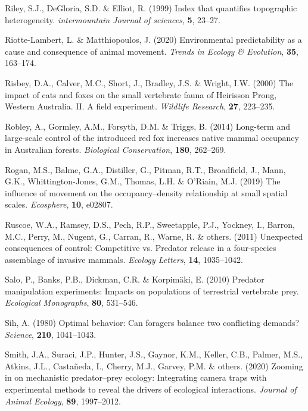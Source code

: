 \documentclass[]{elsarticle} %
\begin{document}
\leavevmode\hypertarget{ref-riley1999index}{}%
Riley, S.J., DeGloria, S.D. \& Elliot, R. (1999) Index that quantifies topographic heterogeneity. \emph{intermountain Journal of sciences}, \textbf{5}, 23--27.

\leavevmode\hypertarget{ref-riotte-lambert2020environmental}{}%
Riotte-Lambert, L. \& Matthiopoulos, J. (2020) Environmental predictability as a cause and consequence of animal movement. \emph{Trends in Ecology \& Evolution}, \textbf{35}, 163--174.

\leavevmode\hypertarget{ref-risbey2000impacts}{}%
Risbey, D.A., Calver, M.C., Short, J., Bradley, J.S. \& Wright, I.W. (2000) The impact of cats and foxes on the small vertebrate fauna of Heirisson Prong, Western Australia. II. A field experiment. \emph{Wildlife Research}, \textbf{27}, 223--235.

\leavevmode\hypertarget{ref-robley2014long}{}%
Robley, A., Gormley, A.M., Forsyth, D.M. \& Triggs, B. (2014) Long-term and large-scale control of the introduced red fox increases native mammal occupancy in Australian forests. \emph{Biological Conservation}, \textbf{180}, 262--269.

\leavevmode\hypertarget{ref-rogan2019influence}{}%
Rogan, M.S., Balme, G.A., Distiller, G., Pitman, R.T., Broadfield, J., Mann, G.K., Whittington-Jones, G.M., Thomas, L.H. \& O'Riain, M.J. (2019) The influence of movement on the occupancy--density relationship at small spatial scales. \emph{Ecosphere}, \textbf{10}, e02807.

\leavevmode\hypertarget{ref-ruscoe2011unexpected}{}%
Ruscoe, W.A., Ramsey, D.S., Pech, R.P., Sweetapple, P.J., Yockney, I., Barron, M.C., Perry, M., Nugent, G., Carran, R., Warne, R. \& others. (2011) Unexpected consequences of control: Competitive vs. Predator release in a four-species assemblage of invasive mammals. \emph{Ecology Letters}, \textbf{14}, 1035--1042.

\leavevmode\hypertarget{ref-salo2010predator}{}%
Salo, P., Banks, P.B., Dickman, C.R. \& Korpimäki, E. (2010) Predator manipulation experiments: Impacts on populations of terrestrial vertebrate prey. \emph{Ecological Monographs}, \textbf{80}, 531--546.

\leavevmode\hypertarget{ref-sih1980optimal}{}%
Sih, A. (1980) Optimal behavior: Can foragers balance two conflicting demands? \emph{Science}, \textbf{210}, 1041--1043.

\leavevmode\hypertarget{ref-smith2020zooming}{}%
Smith, J.A., Suraci, J.P., Hunter, J.S., Gaynor, K.M., Keller, C.B., Palmer, M.S., Atkins, J.L., Castañeda, I., Cherry, M.J., Garvey, P.M. \& others. (2020) Zooming in on mechanistic predator--prey ecology: Integrating camera traps with experimental methods to reveal the drivers of ecological interactions. \emph{Journal of Animal Ecology}, \textbf{89}, 1997--2012.
\end{document}
